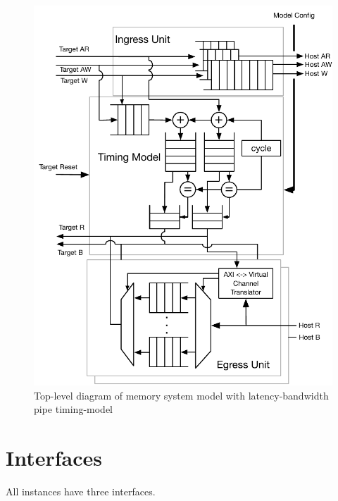 \begin{figure}
	\centering
	\includegraphics[width=\columnwidth]{figures/memory-model-block-diagram.pdf}
	\caption{Top-level diagram of memory system model with latency-bandwidth pipe timing-model}
	\label{fig:timing_model}
\end{figure}

\section{Interfaces}\label{sec:interfaces}

All instances have three interfaces.

